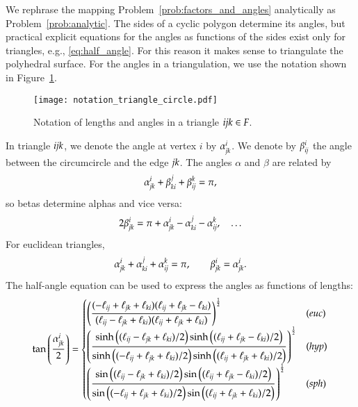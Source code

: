 \documentclass[Thesis]{subfiles}
\begin{document}
We rephrase the mapping Problem~\ref{prob:factors_and_angles}
analytically as Problem~\ref{prob:analytic}. The sides of a cyclic
polygon determine its angles, but practical explicit equations for the
angles as functions of the sides exist only for triangles, e.g.,
\eqref{eq:half_angle}. For this reason it makes sense to triangulate
the polyhedral surface. For the angles in a triangulation, we use the
notation shown in Figure~\ref{fig:triangle_notation}.
\begin{figure}
\centering
\texttt{[image: notation\_triangle\_circle.pdf]}\\
\hspace*{0.3\textwidth}
\caption{Notation of lengths and angles in a triangle ${\it ijk} \in F$.}
\label{fig:triangle_notation}	
\end{figure}
In triangle $\it ijk$, we denote the angle at vertex $i$ by
$\alpha^i_{\it jk}$. We denote by $\beta^i_{\it ij}$ the angle between
the circumcircle and the edge $\it jk$. The angles $\alpha$ and
$\beta$ are related by
\begin{equation*}
  \alpha_{\it jk}^i+\beta_{\it ki}^j+\beta_{\it ij}^k=\pi,
\end{equation*}
so betas determine alphas and vice versa:
\begin{equation}
  \label{eq:beta}
    2\beta_{\it jk}^i = \pi + \alpha_{\it jk}^i - \alpha_{\it ki}^j -
    \alpha_{\it ij}^k,\quad\ldots %
\end{equation}
For euclidean triangles, 
\begin{equation*}
  \alpha_{\it jk}^i+\alpha_{\it
    ki}^j+\alpha_{\it ij}^k=\pi,
  \qquad
  \beta_{\it jk}^i=\alpha_{\it jk}^i.
\end{equation*}
The half-angle equation can be used to express the angles as functions
of lengths:
\begin{equation}
\label{eq:half_angle}
\tan\left(\frac{ \alpha_{\it jk}^i}{2}\right) = 
\begin{cases}
  \left(\dfrac{
    (-\ell_{\it ij} +\ell_{\it jk} +\ell_{\it ki})
    (\ell_{\it ij} +\ell_{\it jk} -\ell_{\it ki})
  }{
    (\ell_{\it ij} -\ell_{\it jk} +\ell_{\it ki})
    (\ell_{\it ij} + \ell_{\it jk} +\ell_{\it ki})
  }\right)^{\frac{1}{2}}
  & (\euc)\\
  \left(\dfrac{
      \sinh\big((\ell_{\it ij}-\ell_{\it jk}+\ell_{\it ki})/2\big)
      \sinh\big((\ell_{\it ij}+\ell_{\it jk}-\ell_{\it ki})/2\big)
    }{
      \sinh\big((-\ell_{\it ij}+\ell_{\it jk}+\ell_{\it ki})/2\big)
      \sinh\big((\ell_{\it ij}+\ell_{\it jk}+\ell_{\it ki})/2\big)
    }\right)^{\frac{1}{2}}
  & (\hyp)\\
  \left(\dfrac{
      \sin\big((\ell_{\it ij}-\ell_{\it jk}+\ell_{\it ki})/2\big)
      \sin\big((\ell_{\it ij}+\ell_{\it jk}-\ell_{\it ki})/2\big)
    }{
      \sin\big((-\ell_{\it ij}+\ell_{\it jk}+\ell_{\it ki})/2\big)
      \sin\big((\ell_{\it ij}+\ell_{\it jk}+\ell_{\it ki})/2\big)
    }\right)^{\frac{1}{2}}
  & (\sph)
\end{cases}
\end{equation}
\end{document}
